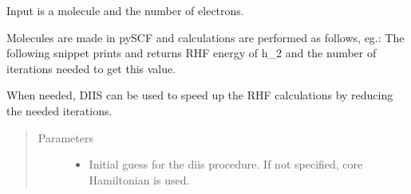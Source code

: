 \documentclass[letterpaper,10pt,english]{sphinxmanual}
\begin{document}
\begin{fulllineitems}
\label{\detokenize{RHF:hf.HartreeFock.RHF.MF}}
Input is a molecule and the number of electrons.

Molecules are made in pySCF and calculations are performed as follows, eg.:
The following snippet prints and returns RHF energy of h\_2
and the number of iterations needed to get this value.

\begin{sphinxVerbatim}[commandchars=\\\{\}]
   
          
   
\end{sphinxVerbatim}

\begin{fulllineitems}
\label{\detokenize{RHF:hf.HartreeFock.RHF.MF.diis}}
When needed, DIIS can be used to speed up the RHF calculations by reducing the needed iterations.
\begin{quote}\begin{description}
\item[{Parameters}] \leavevmode\begin{itemize}
\item {} 
 \textendash{} Initial guess for the diis procedure. If not specified, core Hamiltonian is used.


\end{itemize}
\end{description}
\end{quote}
\end{fulllineitems}
\end{fulllineitems}
\end{document}
